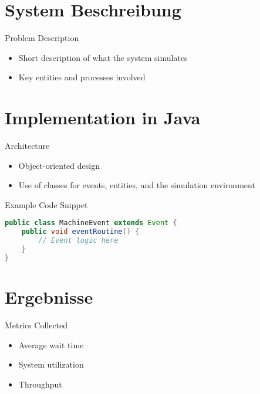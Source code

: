 \documentclass{beamer}
\begin{document}
    \section{System Beschreibung}
    \begin{frame}{Problem Description}
        \begin{itemize}
            \item Short description of what the system simulates
            \item Key entities and processes involved
        \end{itemize}
    \end{frame}

    \section{Implementation in Java}
    \begin{frame}[fragile]{Architecture}
        \begin{itemize}
            \item Object-oriented design
            \item Use of classes for events, entities, and the simulation environment
        \end{itemize}
    \end{frame}

    \begin{frame}[fragile]{Example Code Snippet}
        \begin{lstlisting}[language=Java, caption=Basic event class]
public class MachineEvent extends Event {
    public void eventRoutine() {
        // Event logic here
    }
}
        \end{lstlisting}
    \end{frame}

    \section{Ergebnisse}
    \begin{frame}{Metrics Collected}
        \begin{itemize}
            \item Average wait time
            \item System utilization
            \item Throughput
        \end{itemize}
    \end{frame}
\end{document}
